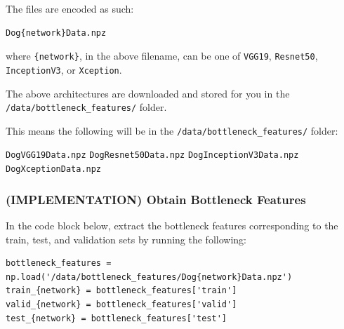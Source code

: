 \documentclass[11pt]{article}
\begin{document}
The files are encoded as such:

\begin{verbatim}
Dog{network}Data.npz
\end{verbatim}

where \texttt{\{network\}}, in the above filename, can be one of
\texttt{VGG19}, \texttt{Resnet50}, \texttt{InceptionV3}, or
\texttt{Xception}.

The above architectures are downloaded and stored for you in the
\texttt{/data/bottleneck\_features/} folder.

This means the following will be in the
\texttt{/data/bottleneck\_features/} folder:

\texttt{DogVGG19Data.npz} \texttt{DogResnet50Data.npz}
\texttt{DogInceptionV3Data.npz} \texttt{DogXceptionData.npz}

\subsubsection{(IMPLEMENTATION) Obtain Bottleneck
Features}\label{implementation-obtain-bottleneck-features}

In the code block below, extract the bottleneck features corresponding
to the train, test, and validation sets by running the following:

\begin{verbatim}
bottleneck_features = np.load('/data/bottleneck_features/Dog{network}Data.npz')
train_{network} = bottleneck_features['train']
valid_{network} = bottleneck_features['valid']
test_{network} = bottleneck_features['test']
\end{verbatim}
\end{document}
